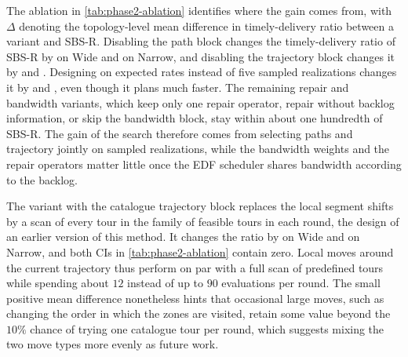 The ablation in \cref{tab:phase2-ablation} identifies where the gain comes from, with $\Delta$ denoting the topology-level mean difference in timely-delivery ratio between a variant and SBS-R. Disabling the path block changes the timely-delivery ratio of SBS-R by \ResultTwoAblationDiffVzeroPFixedPaths{} on Wide and \ResultTwoAblationDiffVzeroBhfivezeroPFixedPaths{} on Narrow, and disabling the trajectory block changes it by \ResultTwoAblationDiffVzeroPFixedTrajectory{} and \ResultTwoAblationDiffVzeroBhfivezeroPFixedTrajectory. Designing on expected rates instead of five sampled realizations changes it by \ResultTwoAblationDiffVzeroPExpectedDesign{} and \ResultTwoAblationDiffVzeroBhfivezeroPExpectedDesign, even though it plans much faster. The remaining repair and bandwidth variants, which keep only one repair operator, repair without backlog information, or skip the bandwidth block, stay within about one hundredth of SBS-R. The gain of the search therefore comes from selecting paths and trajectory jointly on sampled realizations, while the bandwidth weights and the repair operators matter little once the EDF scheduler shares bandwidth according to the backlog.

The variant with the catalogue trajectory block replaces the local segment shifts by a scan of every tour in the family of feasible tours in each round, the design of an earlier version of this method. It changes the ratio by \ResultTwoAblationDiffVzeroPCatalogTrajectory{} on Wide and \ResultTwoAblationDiffVzeroBhfivezeroPCatalogTrajectory{} on Narrow, and both CIs in \cref{tab:phase2-ablation} contain zero. Local moves around the current trajectory thus perform on par with a full scan of predefined tours while spending about $12$ instead of up to $90$ evaluations per round. The small positive mean difference nonetheless hints that occasional large moves, such as changing the order in which the zones are visited, retain some value beyond the $10\%$ chance of trying one catalogue tour per round, which suggests mixing the two move types more evenly as future work.

\label{sec:results-connectivity}


